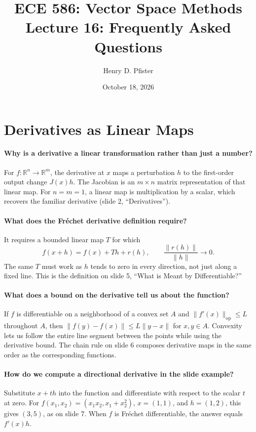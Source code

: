 \documentclass[10pt,english]{article}
\begin{document}
\title{ECE 586: Vector Space Methods \\ Lecture 16: Frequently Asked Questions}
\author{Henry D. Pfister \\ \univ}
\date{October 18, 2026}

\maketitle

\section{Derivatives as Linear Maps}

\paragraph{Why is a derivative a linear transformation rather than just a number?}
For $f\colon\mathbb{R}^n\to\mathbb{R}^m$, the derivative at $x$ maps a perturbation $h$ to the first-order output change $J(x)h$.
The Jacobian is an $m\times n$ matrix representation of that linear map.
For $n=m=1$, a linear map is multiplication by a scalar, which recovers the familiar derivative (slide 2, ``Derivatives'').

\paragraph{What does the Fr\'echet derivative definition require?}
It requires a bounded linear map $T$ for which
\[
f(x+h)=f(x)+Th+r(h),\qquad \frac{\|r(h)\|}{\|h\|}\longrightarrow0.
\]
The same $T$ must work as $h$ tends to zero in every direction, not just along a fixed line.
This is the definition on slide 5, ``What is Meant by Differentiable?''

\paragraph{What does a bound on the derivative tell us about the function?}
If $f$ is differentiable on a neighborhood of a convex set $A$ and $\|f'(x)\|_{\mathrm{op}}\leq L$ throughout $A$, then $\|f(y)-f(x)\|\leq L\|y-x\|$ for $x,y\in A$.
Convexity lets us follow the entire line segment between the points while using the derivative bound.
The chain rule on slide 6 composes derivative maps in the same order as the corresponding functions.

\paragraph{How do we compute a directional derivative in the slide example?}
Substitute $x+th$ into the function and differentiate with respect to the scalar $t$ at zero.
For $f(x_1,x_2)=(x_1x_2,x_1+x_2^2)$, $x=(1,1)$, and $h=(1,2)$, this gives $(3,5)$, as on slide 7.
When $f$ is Fr\'echet differentiable, the answer equals $f'(x)h$.
\end{document}
